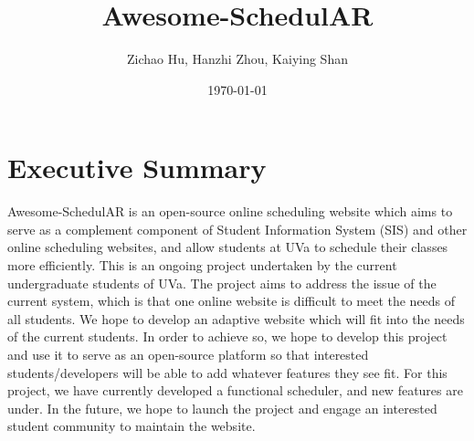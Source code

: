 \documentclass[letterpaper,11pt]{article}
\begin{document}

\title{Awesome-SchedulAR}
\author{Zichao Hu, Hanzhi Zhou, Kaiying Shan}
\date{\today}



\maketitle


\section{Executive Summary}


Awesome-SchedulAR is an open-source online scheduling website which aims to serve as 
a complement component of Student Information System (SIS) and other 
online scheduling websites, and allow students at
UVa to schedule their classes more efficiently. This is an ongoing 
project undertaken by the current undergraduate students of UVa. 
The project aims to address the issue of the current system, which is
that one online website is difficult to meet the needs of all students.
We hope to develop an adaptive website which will fit into the needs 
of the current students. In order to achieve so, we hope to 
develop this project and use it to serve as an open-source platform 
so that interested students/developers will be able to add whatever 
features they see fit. For this project, we have currently developed 
a functional scheduler, and new features are under. In the future, we hope to launch the project and 
engage an interested student community to maintain the website. 
\end{document}
